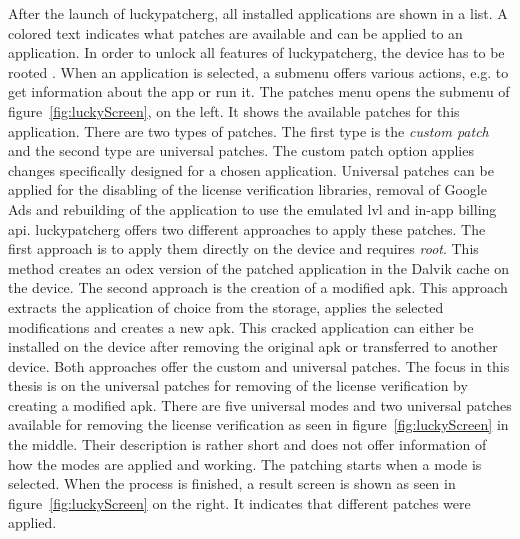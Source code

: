 After the launch of \gls{luckypatcherg}, all installed applications are shown in a list.
A colored text indicates what patches are available and can be applied to an application.
In order to unlock all features of \gls{luckypatcherg}, the device has to be rooted \cite{luckyPatcherOfficial}.
\newline
When an application is selected, a submenu offers various actions, e.g. to get information about the app or run it.
The patches menu opens the submenu of figure~\ref{fig:luckyScreen}, on the left.
It shows the available patches for this application.
\newline
There are two types of patches.
The first type is the \textit{custom patch} and the second type are universal patches.
The custom patch option applies changes specifically designed for a chosen application.
\newline
Universal patches can be applied for the disabling of the license verification libraries, removal of Google Ads and rebuilding of the application to use the emulated \gls{lvl} and in-app billing \gls{api}.
\newline
\gls{luckypatcherg} offers two different approaches to apply these patches.
The first approach is to apply them directly on the device and requires \textit{root}.
This method creates an \gls{odex} version of the patched application in the Dalvik cache on the device.
The second approach is the creation of a modified \gls{apk}.
This approach extracts the application of choice from the storage, applies the selected modifications and creates a new \gls{apk}.
This cracked application can either be installed on the device after removing the original \gls{apk} or transferred to another device.
\newline
Both approaches offer the custom and universal patches.
\newline
\newline
The focus in this thesis is on the universal patches for removing of the license verification by creating a modified \gls{apk}.
\newline
There are five universal modes and two universal patches available for removing the license verification as seen in figure~\ref{fig:luckyScreen} in the middle.
Their description is rather short and does not offer information of how the modes are applied and working.
\newline
The patching starts when a mode is selected.
When the process is finished, a result screen is shown as seen in figure~\ref{fig:luckyScreen} on the right.
It indicates that different patches were applied.
